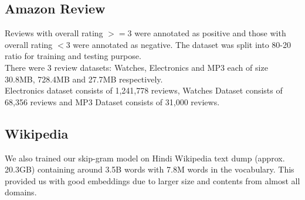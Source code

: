 \subsection{Amazon Review\cite{Mcauley:13}}
\label{data:amazon}
Reviews with overall rating $>=$3 were annotated as positive and those with overall rating $<$3 were annotated as negative. The dataset was split into 80-20 ratio for training and testing purpose.\\
There were 3 review datasets: Watches, Electronics and MP3 each of size 30.8MB, 728.4MB and 27.7MB respectively.\\
Electronics dataset consists of 1,241,778 reviews, Watches Dataset consists of 68,356 reviews and MP3 Dataset consists of 31,000 reviews.

\subsection{Wikipedia}
We also trained our skip-gram model on Hindi Wikipedia text dump (approx. 20.3GB) containing around 3.5B words with 7.8M words in the vocabulary. This provided us with good embeddings due to larger size and contents from almost all domains.
